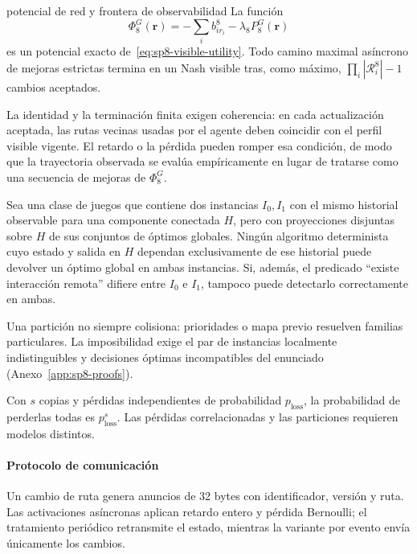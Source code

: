\begin{contribucion}{potencial de red y frontera de observabilidad}
La función
\[
 \Phi_8^G(\boldsymbol r)=-\sum_i b_{i r_i}^8-\lambda_8P_8^G(\boldsymbol r)
\]
es un potencial exacto de~\eqref{eq:sp8-visible-utility}. Todo camino maximal asíncrono de mejoras estrictas termina en un Nash visible tras, como máximo, $\prod_i|\mathcal R_i^8|-1$ cambios aceptados.

La identidad y la terminación finita exigen coherencia: en cada actualización aceptada, las rutas vecinas usadas por el agente deben coincidir con el perfil visible vigente. El retardo o la pérdida pueden romper esa condición, de modo que la trayectoria observada se evalúa empíricamente en lugar de tratarse como una secuencia de mejoras de $\Phi_8^G$.

\begin{proposicion}
\label{prop:sp8-partition-limit}
Sea una clase de juegos que contiene dos instancias $I_0,I_1$ con el mismo historial observable para una componente conectada $H$, pero con proyecciones disjuntas sobre $H$ de sus conjuntos de óptimos globales. Ningún algoritmo determinista cuyo estado y salida en $H$ dependan exclusivamente de ese historial puede devolver un óptimo global en ambas instancias. Si, además, el predicado ``existe interacción remota'' difiere entre $I_0$ e $I_1$, tampoco puede detectarlo correctamente en ambas.
\end{proposicion}
Una partición no siempre colisiona: prioridades o mapa previo resuelven familias particulares. La imposibilidad exige el par de instancias localmente indistinguibles y decisiones óptimas incompatibles del enunciado (Anexo~\ref{app:sp8-proofs}).
\end{contribucion}

Con $s$ copias y pérdidas independientes de probabilidad $p_{\mathrm{loss}}$, la probabilidad de perderlas todas es $p_{\mathrm{loss}}^s$. Las pérdidas correlacionadas y las particiones requieren modelos distintos.

\paragraph{Protocolo de comunicación}

Un cambio de ruta genera anuncios de 32 bytes con identificador, versión y ruta. Las activaciones asíncronas aplican retardo entero y pérdida Bernoulli; el tratamiento periódico retransmite el estado, mientras la variante por evento envía únicamente los cambios.


